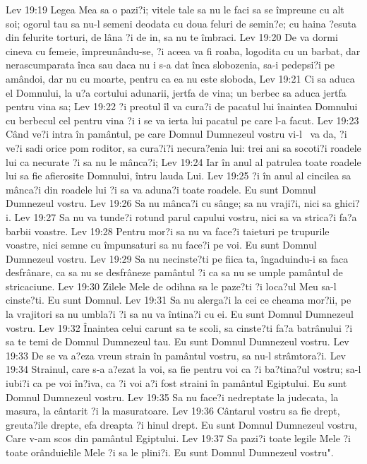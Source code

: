 Lev 19:19  Legea Mea sa o pazi?i; vitele tale sa nu le faci sa se împreune cu alt soi; ogorul tau sa nu-l semeni deodata cu doua feluri de semin?e; cu haina ?esuta din felurite torturi, de lâna ?i de in, sa nu te îmbraci.
Lev 19:20  De va dormi cineva cu femeie, împreunându-se, ?i aceea va fi roaba, logodita cu un barbat, dar nerascumparata înca sau daca nu i s-a dat înca slobozenia, sa-i pedepsi?i pe amândoi, dar nu cu moarte, pentru ca ea nu este sloboda,
Lev 19:21  Ci sa aduca el Domnului, la u?a cortului adunarii, jertfa de vina; un berbec sa aduca jertfa pentru vina sa;
Lev 19:22  ?i preotul îl va cura?i de pacatul lui înaintea Domnului cu berbecul cel pentru vina ?i i se va ierta lui pacatul pe care l-a facut.
Lev 19:23  Când ve?i intra în pamântul, pe care Domnul Dumnezeul vostru vi-l  va da, ?i ve?i sadi orice pom roditor, sa cura?i?i necura?enia lui: trei ani sa socoti?i roadele lui ca necurate ?i sa nu le mânca?i;
Lev 19:24  Iar în anul al patrulea toate roadele lui sa fie afierosite Domnului, întru lauda Lui.
Lev 19:25  ?i în anul al cincilea sa mânca?i din roadele lui ?i sa va aduna?i toate roadele. Eu sunt Domnul Dumnezeul vostru.
Lev 19:26  Sa nu mânca?i cu sânge; sa nu vraji?i, nici sa ghici?i.
Lev 19:27  Sa nu va tunde?i rotund parul capului vostru, nici sa va strica?i fa?a barbii voastre.
Lev 19:28  Pentru mor?i sa nu va face?i taieturi pe trupurile voastre, nici semne cu împunsaturi sa nu face?i pe voi. Eu sunt Domnul Dumnezeul vostru.
Lev 19:29  Sa nu necinste?ti pe fiica ta, îngaduindu-i sa faca desfrânare, ca sa nu se desfrâneze pamântul ?i ca sa nu se umple pamântul de stricaciune.
Lev 19:30  Zilele Mele de odihna sa le paze?ti ?i loca?ul Meu sa-l cinste?ti. Eu sunt Domnul.
Lev 19:31  Sa nu alerga?i la cei ce cheama mor?ii, pe la vrajitori sa nu umbla?i ?i sa nu va întina?i cu ei. Eu sunt Domnul Dumnezeul vostru.
Lev 19:32  Înaintea celui carunt sa te scoli, sa cinste?ti fa?a batrânului ?i sa te temi de Domnul Dumnezeul tau. Eu sunt Domnul Dumnezeul vostru.
Lev 19:33  De se va a?eza vreun strain în pamântul vostru, sa nu-l strâmtora?i.
Lev 19:34  Strainul, care s-a a?ezat la voi, sa fie pentru voi ca ?i ba?tina?ul vostru; sa-l iubi?i ca pe voi în?iva, ca ?i voi a?i fost straini în pamântul Egiptului. Eu sunt Domnul Dumnezeul vostru.
Lev 19:35  Sa nu face?i nedreptate la judecata, la masura, la cântarit ?i la masuratoare.
Lev 19:36  Cântarul vostru sa fie drept, greuta?ile drepte, efa dreapta ?i hinul drept. Eu sunt Domnul Dumnezeul vostru, Care v-am scos din pamântul Egiptului.
Lev 19:37  Sa pazi?i toate legile Mele ?i toate orânduielile Mele ?i sa le plini?i. Eu sunt Domnul Dumnezeul vostru".

